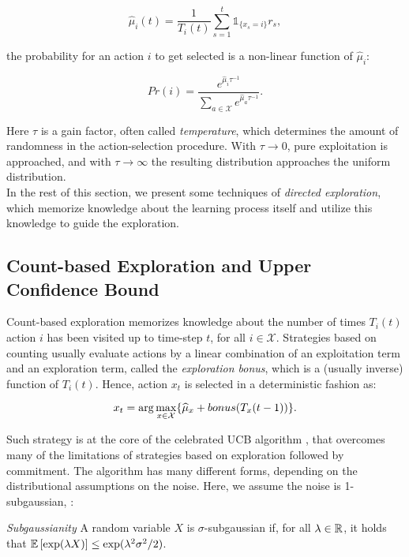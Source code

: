 \begin{equation}
\hat{\mu}_i(t) = \frac{1}{T_i(t)}\sum_{s=1}^{t}\mathds{1}_{\{x_s=i\}}r_s,
\end{equation}

the probability for an action $i$ to get selected is a non-linear function of $\hat{\mu}_i$:

\begin{equation}
Pr(i) = \frac{e^{\hat{\mu}_i \tau^{-1}}}{\sum_{a\in\mathcal{X}}e^{\hat{\mu}_{a}\tau^{-1}}}.
\end{equation}

Here $\tau$ is a gain factor, often called \emph{temperature}, which determines the amount of randomness in the action-selection procedure. With $\tau\to 0$, pure exploitation is approached, and with $\tau\to \infty$ the resulting distribution approaches the uniform distribution. \\
In the rest of this section, we present some techniques of \emph{directed exploration}, which memorize knowledge about the learning process itself and utilize this knowledge to guide the exploration.

\subsection{Count-based Exploration and Upper Confidence Bound} \label{sebsec:count&UCB}
Count-based exploration memorizes knowledge about the number of times $T_i(t)$ action $i$ has been visited up to time-step $t$, for all $i\in\mathcal{X}$. Strategies based on counting usually evaluate actions by a linear combination of an exploitation term and an exploration term, called the \emph{exploration bonus}, which is a (usually inverse) function of $T_i(t)$. Hence, action $x_t$ is selected in a deterministic fashion as:

\begin{equation}
x_t = \arg\max_{x\in\mathcal{X}}\{\widehat{\mu}_x + bonus(T_x(t-1))\}.
\end{equation}

Such strategy is at the core of the celebrated \gls{UCB} algorithm \cite{lai1985asymptotically, agrawal1995continuum, auer2002finite}, that overcomes many of the limitations of strategies based on exploration followed by commitment. The algorithm has many different forms, depending on the distributional assumptions on the noise. Here, we assume the noise is 1-subgaussian, \ie :

\begin{definition} \label{def:subgaussianity}
\emph{Subgaussianity} A random variable $X$ is $\sigma$-subgaussian if, for all $\lambda\in\mathbb{R}$, it holds that $\mathop{\mathbb{E}\left[{\exp(\lambda X)}\right]}\leq\exp(\lambda^2\sigma^2/2)$.
\end{definition}

